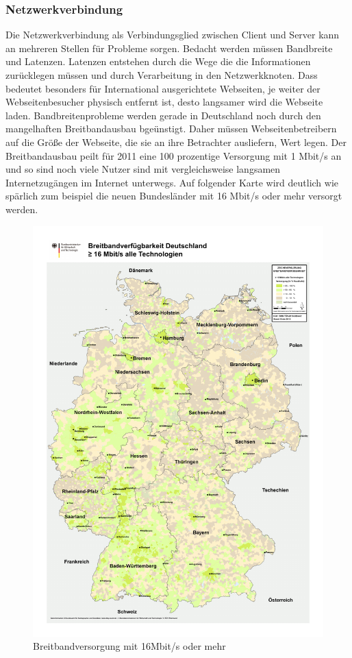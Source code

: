 \subsubsection{Netzwerkverbindung}
Die Netzwerkverbindung als Verbindungsglied zwischen Client und Server kann an mehreren Stellen f\"ur Probleme sorgen. Bedacht werden m\"ussen Bandbreite und Latenzen. Latenzen entstehen durch die Wege die die Informationen zur\"ucklegen m\"ussen und durch Verarbeitung in den Netzwerkknoten. Dass bedeutet besonders f\"ur International ausgerichtete Webseiten, je weiter der Webseitenbesucher physisch entfernt ist, desto langsamer wird die Webseite laden. Bandbreitenprobleme werden gerade in Deutschland noch durch den mangelhaften Breitbandausbau bge\"unstigt. Daher m\"ussen Webseitenbetreibern auf die Größe der Webseite, die sie an ihre Betrachter ausliefern, Wert legen. Der Breitbandausbau peilt für 2011 eine 100 prozentige Versorgung mit 1 Mbit/s an und so sind noch viele Nutzer sind mit vergleichsweise langsamen Internetzugängen im Internet unterwegs.%
Auf folgender Karte wird deutlich wie sp\"arlich zum beispiel die neuen Bundesl\"ander mit 16 Mbit/s oder mehr versorgt werden.
\begin{figure}[htbp]
  \centering
  \includegraphics[scale=0.5]{material/breitband201116mbit.pdf}
  \caption{Breitbandversorgung mit 16Mbit/s oder mehr}
  \label{fig:breitband}
\end{figure}

